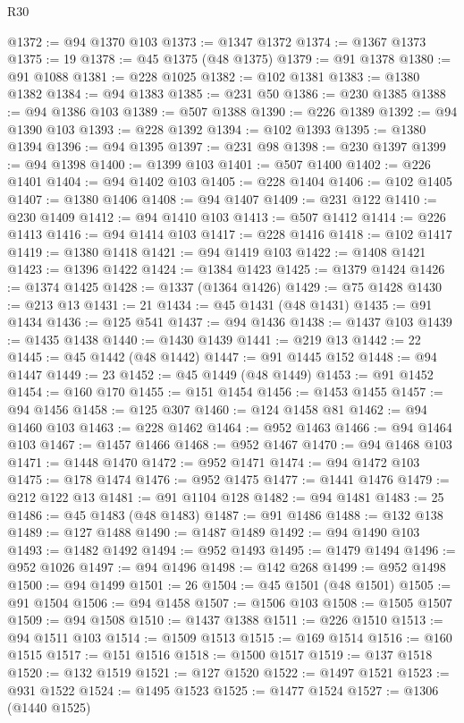 \begin{lexlean}{R30}
\begin{coremodule}
@1372 := @94 @1370 @103
@1373 := @1347 @1372
@1374 := @1367 @1373
@1375 := 19
@1378 := @45 @1375 (@48 @1375)
@1379 := @91 @1378
@1380 := @91 @1088
@1381 := @228 @1025
@1382 := @102 @1381
@1383 := @1380 @1382
@1384 := @94 @1383
@1385 := @231 @50
@1386 := @230 @1385
@1388 := @94 @1386 @103
@1389 := @507 @1388
@1390 := @226 @1389
@1392 := @94 @1390 @103
@1393 := @228 @1392
@1394 := @102 @1393
@1395 := @1380 @1394
@1396 := @94 @1395
@1397 := @231 @98
@1398 := @230 @1397
@1399 := @94 @1398
@1400 := @1399 @103
@1401 := @507 @1400
@1402 := @226 @1401
@1404 := @94 @1402 @103
@1405 := @228 @1404
@1406 := @102 @1405
@1407 := @1380 @1406
@1408 := @94 @1407
@1409 := @231 @122
@1410 := @230 @1409
@1412 := @94 @1410 @103
@1413 := @507 @1412
@1414 := @226 @1413
@1416 := @94 @1414 @103
@1417 := @228 @1416
@1418 := @102 @1417
@1419 := @1380 @1418
@1421 := @94 @1419 @103
@1422 := @1408 @1421
@1423 := @1396 @1422
@1424 := @1384 @1423
@1425 := @1379 @1424
@1426 := @1374 @1425
@1428 := @1337 (@1364 @1426)
@1429 := @75 @1428
@1430 := @213 @13
@1431 := 21
@1434 := @45 @1431 (@48 @1431)
@1435 := @91 @1434
@1436 := @125 @541
@1437 := @94 @1436
@1438 := @1437 @103
@1439 := @1435 @1438
@1440 := @1430 @1439
@1441 := @219 @13
@1442 := 22
@1445 := @45 @1442 (@48 @1442)
@1447 := @91 @1445 @152
@1448 := @94 @1447
@1449 := 23
@1452 := @45 @1449 (@48 @1449)
@1453 := @91 @1452
@1454 := @160 @170
@1455 := @151 @1454
@1456 := @1453 @1455
@1457 := @94 @1456
@1458 := @125 @307
@1460 := @124 @1458 @81
@1462 := @94 @1460 @103
@1463 := @228 @1462
@1464 := @952 @1463
@1466 := @94 @1464 @103
@1467 := @1457 @1466
@1468 := @952 @1467
@1470 := @94 @1468 @103
@1471 := @1448 @1470
@1472 := @952 @1471
@1474 := @94 @1472 @103
@1475 := @178 @1474
@1476 := @952 @1475
@1477 := @1441 @1476
@1479 := @212 @122 @13
@1481 := @91 @1104 @128
@1482 := @94 @1481
@1483 := 25
@1486 := @45 @1483 (@48 @1483)
@1487 := @91 @1486
@1488 := @132 @138
@1489 := @127 @1488
@1490 := @1487 @1489
@1492 := @94 @1490 @103
@1493 := @1482 @1492
@1494 := @952 @1493
@1495 := @1479 @1494
@1496 := @952 @1026
@1497 := @94 @1496
@1498 := @142 @268
@1499 := @952 @1498
@1500 := @94 @1499
@1501 := 26
@1504 := @45 @1501 (@48 @1501)
@1505 := @91 @1504
@1506 := @94 @1458
@1507 := @1506 @103
@1508 := @1505 @1507
@1509 := @94 @1508
@1510 := @1437 @1388
@1511 := @226 @1510
@1513 := @94 @1511 @103
@1514 := @1509 @1513
@1515 := @169 @1514
@1516 := @160 @1515
@1517 := @151 @1516
@1518 := @1500 @1517
@1519 := @137 @1518
@1520 := @132 @1519
@1521 := @127 @1520
@1522 := @1497 @1521
@1523 := @931 @1522
@1524 := @1495 @1523
@1525 := @1477 @1524
@1527 := @1306 (@1440 @1525)

\end{coremodule}
\end{lexlean}
